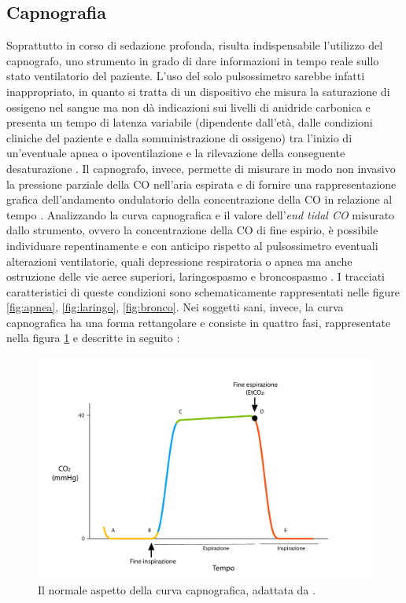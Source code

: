 \subsection*{Capnografia}
Soprattutto in corso di sedazione profonda, risulta indispensabile l'utilizzo del capnografo, uno strumento in grado di dare informazioni in tempo reale sullo stato ventilatorio del paziente. L'uso del solo pulsossimetro sarebbe infatti inappropriato, in quanto si tratta di un dispositivo che misura la saturazione di ossigeno nel sangue ma non dà indicazioni sui livelli di anidride carbonica e presenta un tempo di latenza variabile (dipendente dall'età, dalle condizioni cliniche del paziente e dalla somministrazione di ossigeno) tra l'inizio di un'eventuale apnea o ipoventilazione e la rilevazione della conseguente desaturazione \cite{Long2017}. Il capnografo, invece, permette di misurare in modo non invasivo la pressione parziale della CO nell'aria espirata e di fornire una rappresentazione grafica dell'andamento ondulatorio della concentrazione della CO in relazione al tempo \cite{Baruch2005}. Analizzando la curva capnografica e il valore dell'\emph{end tidal CO} misurato dallo strumento, ovvero la concentrazione della CO di fine espirio, è possibile individuare repentinamente e con anticipo rispetto al pulsossimetro eventuali alterazioni ventilatorie, quali depressione respiratoria o apnea ma anche ostruzione delle vie aeree superiori, laringospasmo e broncospasmo \cite{Long2017}. I tracciati caratteristici di queste condizioni sono schematicamente rappresentati nelle figure \ref{fig:apnea}, \ref{fig:laringo}, \ref{fig:bronco}.
Nei soggetti sani, invece, la curva capnografica ha una forma rettangolare e consiste in quattro fasi, rappresentate nella figura \ref{fig:curvacapno} e descritte in seguito \cite{Uptodatecapno}: 

\begin{figure}[t]
    \centering
    \includegraphics[width=1\textwidth]{Figure/capnopdf1.pdf}
    \caption{Il normale aspetto della curva capnografica, adattata da \cite{Baruch2005}.}
    \label{fig:curvacapno}
\end{figure}

